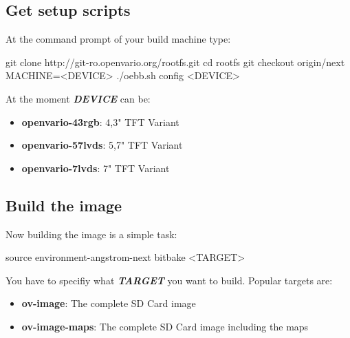 \subsection{Get setup scripts}

At the command prompt of your build machine type:

\begin{verbatim*}
git clone http://git-ro.openvario.org/rootfs.git
cd rootfs
git checkout origin/next
MACHINE=<DEVICE> ./oebb.sh config <DEVICE>
\end{verbatim*}

At the moment \textbf{\textit{DEVICE}} can be:

\begin{itemize}
	\item \textbf{openvario-43rgb}: 4,3" TFT Variant
	\item \textbf{openvario-57lvds}: 5,7" TFT Variant
	\item \textbf{openvario-7lvds}: 7" TFT Variant
\end{itemize}

\subsection{Build the image}
Now building the image is a simple task:

\begin{verbatim*}
source environment-angstrom-next
bitbake <TARGET>
\end{verbatim*}

You have to specifiy what \textbf{\textit{TARGET}} you want to build. Popular targets are:
\begin{itemize}
	\item \textbf{ov-image}: The complete SD Card image
	\item \textbf{ov-image-maps}: The complete SD Card image including the maps
\end{itemize}

